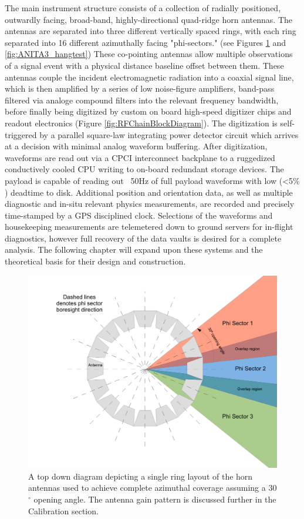 	The main instrument structure consists of a collection of radially positioned, outwardly facing, broad-band, highly-directional quad-ridge horn antennas.  The antennas are separated into three different vertically spaced rings, with each ring separated into 16 different azimuthally facing "phi-sectors." (see Figures \ref{fig:phiSectors} and \ref{fig:ANITA3_hangtest})    These co-pointing antennas allow multiple observations of a signal event with a physical distance baseline offset between them. These antennas couple the incident electromagnetic radiation into a coaxial signal line, which is then amplified by a series of low noise-figure amplifiers, band-pass filtered via analoge compound filters into the relevant frequency bandwidth, before finally being digitized by custom on board high-speed digitizer chips and readout electronics (Figure \ref{fig:RFChainBlockDiagram}).  The digitization is self-triggered by a parallel square-law integrating power detector circuit which arrives at a decision with minimal analog waveform buffering.  After digitization, waveforms are read out via a CPCI interconnect backplane to a ruggedized conductively cooled CPU writing to on-board redundant storage devices.  The payload is capable of reading out ~50Hz of full payload waveforms with low (\textless 5\% ) deadtime to disk.  Additional position and orientation data, as well as multiple diagnostic and in-situ relevant physics measurements, are recorded and precisely time-stamped by a GPS disciplined clock.  Selections of the waveforms and housekeeping measurements are telemetered down to ground servers for in-flight diagnostics, however full recovery of the data vaults is desired for a complete analysis.  The following chapter will expand upon these systems and the theoretical basis for their design and construction.
	
	
\begin{figure}
\centering
	\includegraphics[width=\textwidth]{figures/phiSectors} 
	\caption{A top down diagram depicting a single ring layout of the horn antennas used to achieve complete azimuthal coverage assuming a 30$^{\circ}$  opening angle.  The antenna gain pattern is discussed further in the Calibration section.}
	\label{fig:phiSectors}
\end{figure}

